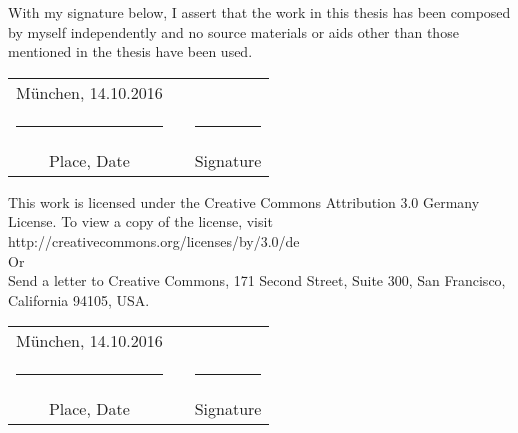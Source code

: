 \thispagestyle{plain}


\vspace*{1cm}
With my signature below, I assert that the work in this thesis has been composed by myself independently and no source materials or aids other than those mentioned in the thesis have been used.



\vspace{2cm}

\hspace{1cm}\begin{tabular}{ccc}
\vspace{-0.3cm}München, 14.10.2016 	&\hspace{4cm} 		& \\
\rule{4.5cm}{0.4pt}					&					&\rule{4.5cm}{0.4pt}\\
Place, Date							&					& Signature			
\end{tabular}

           		






\vspace{4cm}
This work is licensed under the Creative Commons Attribution 3.0 Germany License. To view a copy of the license, visit http://creativecommons.org/licenses/by/3.0/de\\

Or\\

Send a letter to Creative Commons, 171 Second Street, Suite 300, San Francisco, California 94105, USA.

\vspace{2cm}



\hspace{1cm}\begin{tabular}{ccc}
\vspace{-0.3cm}München, 14.10.2016 	&\hspace{4cm} 		& \\
\rule{4.5cm}{0.4pt}					&					&\rule{4.5cm}{0.4pt}\\
Place, Date							&					& Signature	
\end{tabular}